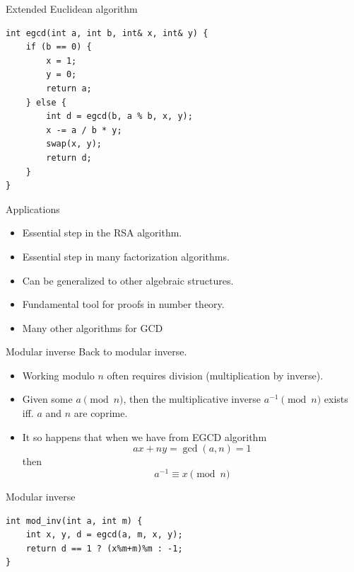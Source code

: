 \documentclass{beamer}
\begin{document}
\begin{frame}{Extended Euclidean algorithm}
  \vspace{10pt}
    \begin{verbatim}
int egcd(int a, int b, int& x, int& y) {
    if (b == 0) {
        x = 1;
        y = 0;
        return a;
    } else {
        int d = egcd(b, a % b, x, y);
        x -= a / b * y;
        swap(x, y);
        return d;
    }
}
    \end{verbatim}
\end{frame}

\begin{frame}[plain]{Applications}
  \vspace{40pt}
  \begin{itemize}
    \item Essential step in the RSA algorithm.
    \item Essential step in many factorization algorithms.
    \item Can be generalized to other algebraic structures.
    \item Fundamental tool for proofs in number theory.
    \item Many other algorithms for GCD
  \end{itemize}
\end{frame}

\begin{frame}[plain]{Modular inverse}
  \vspace{20pt}
  Back to modular inverse.
  \begin{itemize}
    \item Working modulo $n$ often requires division (multiplication by inverse).
    \item Given some $a \pmod{n}$, then the multiplicative inverse $a^{-1}
      \pmod{n}$ exists iff. $a$ and $n$ are coprime.
    \item It so happens that when we have from EGCD algorithm
      \[
        ax + ny = \gcd(a,n) = 1
      \]
      then \[ a^{-1} \equiv x \pmod{n} \]
  \end{itemize}
\end{frame}

\begin{frame}{Modular inverse}
    \begin{verbatim}
int mod_inv(int a, int m) {
    int x, y, d = egcd(a, m, x, y);
    return d == 1 ? (x%m+m)%m : -1;
}
\end{verbatim}
\end{frame}
\end{document}
